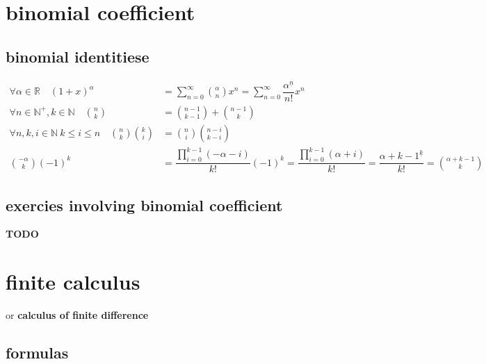 \documentclass{article}
\newcommand{\N}{\mathbb{N}}
\begin{document}
\section{binomial coefficient}

\subsection{binomial identitiese}

\[
	\begin{aligned}
		\forall \alpha\in \mathbb{R}\quad
		{(1+x)}^{\alpha}
		                         & =\sum_{n=0}^\infty \binom{\alpha}{n}x^n=\sum_{n=0}^\infty \dfrac{\alpha^{\underline n}}{n!} x^n \\
		\forall n\in \N^+, k\in \N\quad \binom{n}{k}
		                         & = \binom{n-1}{k-1}+\binom{n-1}{k}                                                               \\
		\forall n,k,i\in \N\ k\leq i\leq n\quad
		\binom{n}{k}\binom{k}{i} & = \binom{n}{i}\binom{n-i}{k-i}                                                                  \\
		\binom{-\alpha}{k}{(-1)}^k
		                         & =\dfrac{\prod_{i=0}^{k-1}(-\alpha-i)}{k!}{(-1)}^k
		=\dfrac{\prod_{i=0}^{k-1}(\alpha+i)}{k!}
		=\dfrac{{\alpha+k-1}^{\underline k}}{k!}
		=\binom{\alpha+k-1}{k}
	\end{aligned}
\]

\subsection{exercies involving binomial coefficient}

\textbf{TODO}

\newpage

\section{finite calculus}

or \textbf{calculus of finite difference}

\subsection{formulas}
\end{document}
